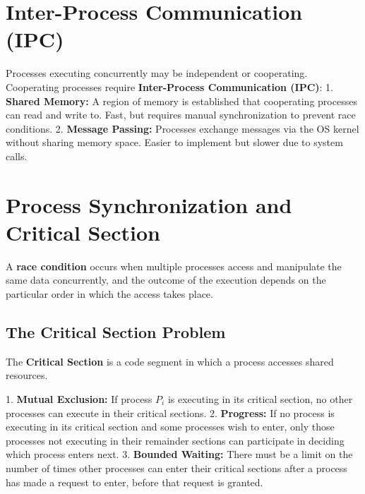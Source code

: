 \documentclass[12pt,a4paper]{article}
\begin{document}
\section{Inter-Process Communication (IPC)}

Processes executing concurrently may be independent or cooperating. Cooperating processes require \textbf{Inter-Process Communication (IPC)}:
1. \textbf{Shared Memory:} A region of memory is established that cooperating processes can read and write to. Fast, but requires manual synchronization to prevent race conditions.
2. \textbf{Message Passing:} Processes exchange messages via the OS kernel without sharing memory space. Easier to implement but slower due to system calls.

\section{Process Synchronization and Critical Section}

A \textbf{race condition} occurs when multiple processes access and manipulate the same data concurrently, and the outcome of the execution depends on the particular order in which the access takes place.

\subsection{The Critical Section Problem}
The \textbf{Critical Section} is a code segment in which a process accesses shared resources.

\begin{tcolorbox}[defbox, title={\textbf{Three Requirements for a Critical Section Solution}}]
1. \textbf{Mutual Exclusion:} If process $P_i$ is executing in its critical section, no other processes can execute in their critical sections.
2. \textbf{Progress:} If no process is executing in its critical section and some processes wish to enter, only those processes not executing in their remainder sections can participate in deciding which process enters next.
3. \textbf{Bounded Waiting:} There must be a limit on the number of times other processes can enter their critical sections after a process has made a request to enter, before that request is granted.
\end{tcolorbox}
\end{document}
